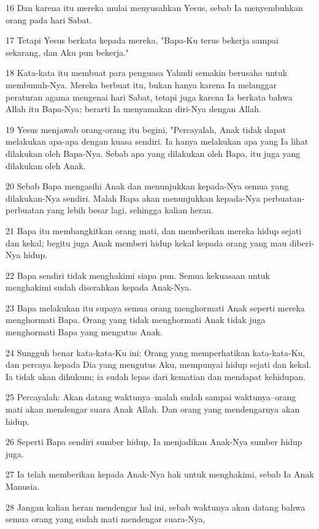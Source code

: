 \par 16 Dan karena itu mereka mulai menyusahkan Yesus, sebab Ia menyembuhkan orang pada hari Sabat.
\par 17 Tetapi Yesus berkata kepada mereka, "Bapa-Ku terus bekerja sampai sekarang, dan Aku pun bekerja."
\par 18 Kata-kata itu membuat para penguasa Yahudi semakin berusaha untuk membunuh-Nya. Mereka berbuat itu, bukan hanya karena Ia melanggar peraturan agama mengenai hari Sabat, tetapi juga karena Ia berkata bahwa Allah itu Bapa-Nya; berarti Ia menyamakan diri-Nya dengan Allah.
\par 19 Yesus menjawab orang-orang itu begini, "Percayalah, Anak tidak dapat melakukan apa-apa dengan kuasa sendiri. Ia hanya melakukan apa yang Ia lihat dilakukan oleh Bapa-Nya. Sebab apa yang dilakukan oleh Bapa, itu juga yang dilakukan oleh Anak.
\par 20 Sebab Bapa mengasihi Anak dan menunjukkan kepada-Nya semua yang dilakukan-Nya sendiri. Malah Bapa akan menunjukkan kepada-Nya perbuatan-perbuatan yang lebih besar lagi, sehingga kalian heran.
\par 21 Bapa itu membangkitkan orang mati, dan memberikan mereka hidup sejati dan kekal; begitu juga Anak memberi hidup kekal kepada orang yang mau diberi-Nya hidup.
\par 22 Bapa sendiri tidak menghakimi siapa pun. Semua kekuasaan untuk menghakimi sudah diserahkan kepada Anak-Nya.
\par 23 Bapa melakukan itu supaya semua orang menghormati Anak seperti mereka menghormati Bapa. Orang yang tidak menghormati Anak tidak juga menghormati Bapa yang mengutus Anak.
\par 24 Sungguh benar kata-kata-Ku ini: Orang yang memperhatikan kata-kata-Ku, dan percaya kepada Dia yang mengutus Aku, mempunyai hidup sejati dan kekal. Ia tidak akan dihukum; ia sudah lepas dari kematian dan mendapat kehidupan.
\par 25 Percayalah: Akan datang waktunya--malah sudah sampai waktunya--orang mati akan mendengar suara Anak Allah. Dan orang yang mendengarnya akan hidup.
\par 26 Seperti Bapa sendiri sumber hidup, Ia menjadikan Anak-Nya sumber hidup juga.
\par 27 Ia telah memberikan kepada Anak-Nya hak untuk menghakimi, sebab Ia Anak Manusia.
\par 28 Jangan kalian heran mendengar hal ini, sebab waktunya akan datang bahwa semua orang yang sudah mati mendengar suara-Nya,
